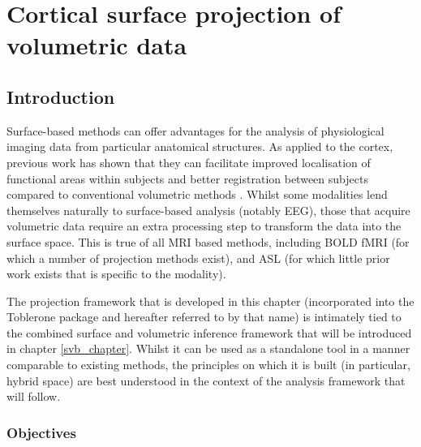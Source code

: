 \documentclass[12pt]{report}
\begin{document}

\chapter{Cortical surface projection of volumetric data}
\label{projection_chapter}

\section{Introduction}

Surface-based methods can offer advantages for the analysis of physiological imaging data from particular anatomical structures. As applied to the cortex, previous work has shown that they can facilitate improved localisation of functional areas within subjects and better registration between subjects compared to conventional volumetric methods \cite{Glasser2016, Coalson2017}. Whilst some modalities lend themselves naturally to surface-based analysis (notably EEG), those that acquire volumetric data require an extra processing step to transform the data into the surface space. This is true of all MRI based methods, including BOLD fMRI (for which a number of projection methods exist), and ASL (for which little prior work exists that is specific to the modality). 

The projection framework that is developed in this chapter (incorporated into the Toblerone package and hereafter referred to by that name) is intimately tied to the combined surface and volumetric inference framework that will be introduced in chapter \ref{svb_chapter}. Whilst it can be used as a standalone tool in a manner comparable to existing methods, the principles on which it is built (in particular, hybrid space) are best understood in the context of the analysis framework that will follow. 


\subsection{Objectives}
\end{document}
